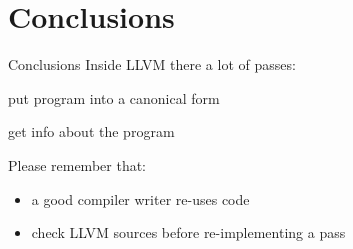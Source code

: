 
\section{Conclusions}
\begin{frame}{Conclusions}
Inside LLVM there a lot of passes:

\begin{description}[normalization]
\item[normalization] put program into a canonical form
\item[analysis] get info about the program
\end{description}

\vfill
Please remember that:
\begin{itemize}
\item a good compiler writer \alert{re-uses} code
\item check LLVM sources before re-implementing a pass
\end{itemize}
\vfill
\end{frame}